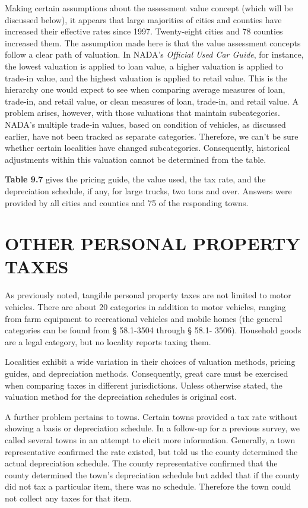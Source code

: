 \documentclass[
]{book}
\begin{document}
Making certain assumptions about the assessment value concept (which will be discussed below), it appears that large majorities of cities and counties have increased their effective rates since 1997. Twenty-eight cities and 78 counties increased them. The assumption made here is that the value assessment concepts follow a clear path of valuation. In NADA's \emph{Official Used Car Guide}, for instance, the lowest valuation is applied to loan value, a higher valuation is applied to trade-in value, and the highest valuation is applied to retail value. This is the hierarchy one would expect to see when comparing average measures of loan, trade-in, and retail value, or clean measures of loan, trade-in, and retail value. A problem arises, however, with those valuations that maintain subcategories. NADA's multiple trade-in values, based on condition of vehicles, as discussed earlier, have not been tracked as separate categories. Therefore, we can't be sure whether certain localities have changed subcategories. Consequently, historical adjustments within this valuation cannot be determined from the table.

\textbf{Table 9.7} gives the pricing guide, the value used, the tax rate, and the depreciation schedule, if any, for large trucks, two tons and over. Answers were provided by all cities and counties and 75 of the responding towns.

\hypertarget{other-personal-property-taxes}{%
\section{OTHER PERSONAL PROPERTY TAXES}\label{other-personal-property-taxes}}

As previously noted, tangible personal property taxes are not limited to motor vehicles. There are about 20 categories in addition to motor vehicles, ranging from farm equipment to recreational vehicles and mobile homes (the general categories can be found from § 58.1-3504 through § 58.1- 3506). Household goods are a legal category, but no locality reports taxing them.

Localities exhibit a wide variation in their choices of valuation methods, pricing guides, and depreciation methods. Consequently, great care must be exercised when comparing taxes in different jurisdictions. Unless otherwise stated, the valuation method for the depreciation schedules is original cost.

A further problem pertains to towns. Certain towns provided a tax rate without showing a basis or depreciation schedule. In a follow-up for a previous survey, we called several towns in an attempt to elicit more information. Generally, a town representative confirmed the rate existed, but told us the county determined the actual depreciation schedule. The county representative confirmed that the county determined the town's depreciation schedule but added that if the county did not tax a particular item, there was no schedule. Therefore the town could not collect any taxes for that item.
\end{document}
